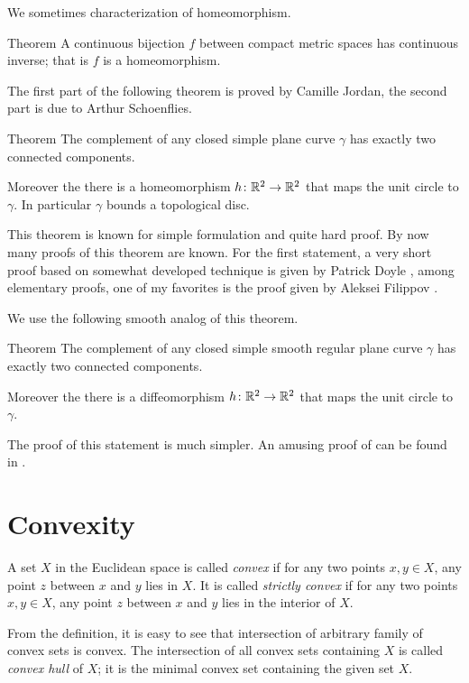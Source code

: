 We sometimes characterization of homeomorphism.

\begin{thm}{Theorem}\label{thm:Hausdorff-compact}
A continuous bijection $f$ between compact metric spaces has continuous inverse;
that is $f$ is a homeomorphism.
\end{thm}


The first part of the following theorem is proved by Camille Jordan, the second part is due to Arthur Schoenflies.

\begin{thm}{Theorem}
The complement of any closed simple plane curve $\gamma$ has exactly two connected components. 

Moreover the there is a homeomorphism $h\colon\mathbb{R}^2\to \mathbb{R}^2$ that maps the unit circle to $\gamma$.
In particular $\gamma$ bounds a topological disc.
\end{thm}

This theorem is known for simple formulation and quite hard proof.
By now many proofs of this theorem are known.
For the first statement, a very short proof based on somewhat developed technique is given by Patrick Doyle \cite{doyle},
among elementary proofs, one of my favorites is the proof given by Aleksei Filippov \cite{filippov}.

We use the following smooth analog of this theorem.

\begin{thm}{Theorem}
The complement of any closed simple smooth regular plane curve $\gamma$ has exactly two connected components. 

Moreover the there is a diffeomorphism $h\colon\mathbb{R}^2\to \mathbb{R}^2$ that maps the unit circle to $\gamma$.
\end{thm}

The proof of this statement is much simpler.
An amusing proof of can be found in \cite{chambers-liokumovich}.

\section{Convexity}

A set $X$ in the Euclidean space is called \emph{convex} if for any two points $x,y\in X$, any point $z$ between $x$ and $y$ lies in $X$.
It is called  \emph{strictly convex} if for any two points $x,y\in X$, any point $z$ between $x$ and $y$ lies in the interior of $X$.

From the definition, it is easy to see that intersection of arbitrary family of convex sets is convex. 
The intersection of all convex sets containing $X$ is called \emph{convex hull} of $X$;
it is the minimal convex set containing the given set $X$.


